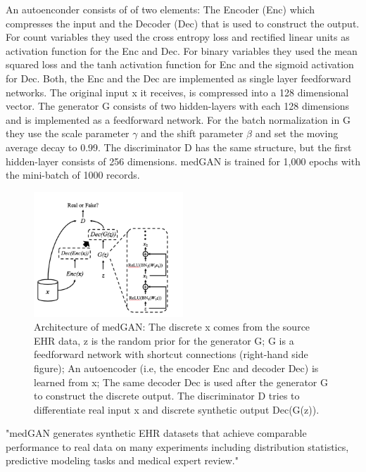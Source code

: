 \documentclass[11pt, a4paper]{book}
\begin{document}
An autoenconder consists of of two elements: The Encoder (Enc) which compresses the input and the Decoder (Dec) that is used to construct the output.
For count variables they used the cross entropy loss and rectified linear units  as activation function for the Enc and Dec.
For binary variables they used the mean squared loss and the tanh activation function for Enc and the sigmoid activation for Dec.
Both, the Enc and the Dec are implemented as single layer feedforward networks. The original input x it receives, is compressed into a 128 dimensional vector. The generator G consists of two hidden-layers with each 128 dimensions and is implemented as a feedforward network. For the batch normalization in G they use the scale parameter  $\gamma$ and the shift parameter $\beta$ and set the moving average decay to 0.99. The discriminator D has the same structure, but the first hidden-layer consists of 256 dimensions. medGAN is trained for 1,000 epochs with the mini-batch of 1000 records. \cite{Choi2017}
\begin{figure}
  \begin{center}
  \includegraphics[width=0.5\textwidth]{img/medgan-architecture.png}
  \caption{Architecture of medGAN: The discrete x comes from the source EHR data, z is the random prior for the generator G; G is a feedforward network with shortcut connections (right-hand side figure); An autoencoder (i.e, the encoder Enc and decoder Dec) is learned from x; The same decoder Dec is used after the generator G to construct the discrete output. The discriminator D tries to differentiate real input x and discrete synthetic output Dec(G(z)).  \cite{Choi2017}}
  \label{fig:transfer_learning_no}
  \end{center}
\end{figure}

"medGAN generates synthetic EHR datasets that achieve comparable performance to real data on many experiments including distribution statistics, predictive modeling tasks and medical expert review."
\end{document}
